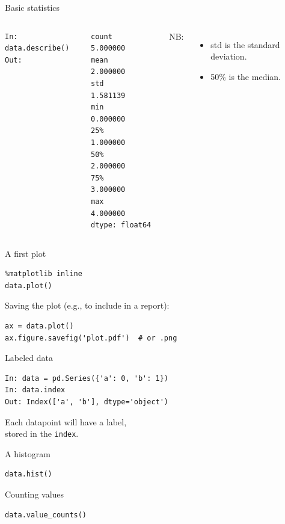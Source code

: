 \documentclass{beamer}
\begin{document}
\begin{frame}[fragile]{Basic statistics}
\begin{columns}
\begin{lstlisting}
In: data.describe()
Out:
\end{lstlisting}
\begin{lstlisting}[style=plain]
count    5.000000
mean     2.000000
std      1.581139
min      0.000000
25%      1.000000
50%      2.000000
75%      3.000000
max      4.000000
dtype: float64
\end{lstlisting}
    NB:
    \begin{itemize}
        \item std is the standard deviation.
        \item 50\% is the median.
    \end{itemize}
\end{columns}
\end{frame}

\begin{frame}[fragile]{A first plot}
\begin{lstlisting}
%matplotlib inline
data.plot()
\end{lstlisting}
\pause

Saving the plot (e.g., to include in a report):
\begin{lstlisting}
ax = data.plot()
ax.figure.savefig('plot.pdf')  # or .png
\end{lstlisting}
\end{frame}

\begin{frame}[fragile]{Labeled data}
\begin{lstlisting}
In: data = pd.Series({'a': 0, 'b': 1})
In: data.index
Out: Index(['a', 'b'], dtype='object')
\end{lstlisting}

Each datapoint will have a label, \\
stored in the \texttt{index}.
\end{frame}

\begin{frame}[fragile]{A histogram}
\begin{lstlisting}
data.hist()
\end{lstlisting}
\end{frame}

\begin{frame}[fragile]{Counting values}
\begin{lstlisting}
data.value_counts()
\end{lstlisting}
\end{frame}
\end{document}
